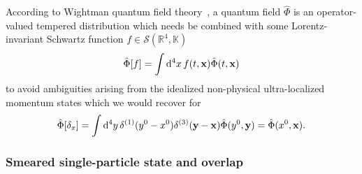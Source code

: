 According to Wightman quantum field theory~\cite[p.~324]{Bogolubov1989}, a quantum field $\hat\Phi$ is an operator-valued tempered distribution which needs be combined with some Lorentz-invariant Schwartz function $f\in\mathcal{S}(\mathbb{R}^4,\mathbb{K})$
\begin{equation}
	\hat\Phi[f]
	=
	\int\dd[4]{x}
	f(t,\vb{x})
	\hat\Phi(t,\vb{x})
\end{equation}
to avoid ambiguities arising from the idealized non-physical ultra-localized momentum states which we would recover for
\begin{equation}
	\hat\Phi[\delta_x]
	=
	\int\dd[4]{y}
	\delta^{(1)}(y^0-x^0)
	\delta^{(3)}(\vb{y}-\vb{x})
	\hat\Phi(y^0,\vb{y})
	=
	\hat\Phi(x^0,\vb{x})
	.
\end{equation}

\subsubsection{Smeared single-particle state and overlap}

